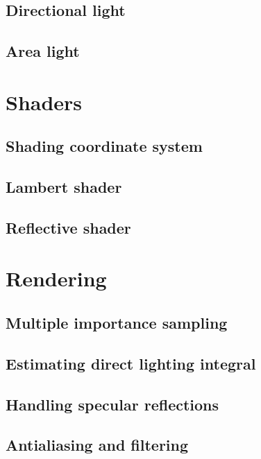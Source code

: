 \subsection{Directional light}

\subsection{Area light}

\section{Shaders}

\subsection{Shading coordinate system}

\subsection{Lambert shader}

\subsection{Reflective shader}

\section{Rendering}

\subsection{Multiple importance sampling}

\subsection{Estimating direct lighting integral}

\subsection{Handling specular reflections}

\subsection{Antialiasing and filtering}



